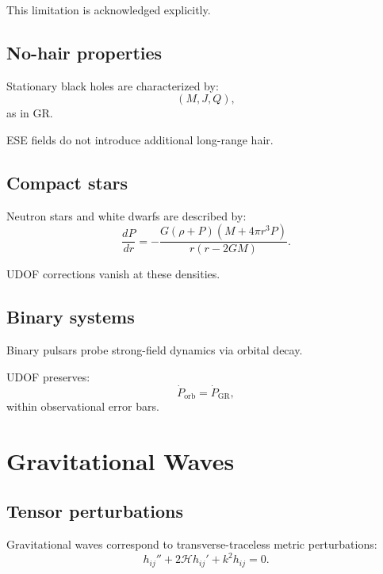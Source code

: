 \documentclass[11pt]{book}
\begin{document}
This limitation is acknowledged explicitly.

\section{No-hair properties}

Stationary black holes are characterized by:
\begin{equation}
(M, J, Q),
\end{equation}
as in GR.

ESE fields do not introduce additional long-range hair.

\section{Compact stars}

Neutron stars and white dwarfs are described by:
\begin{equation}
\frac{dP}{dr} =
- \frac{G (\rho + P)(M + 4\pi r^3 P)}{r(r - 2GM)}.
\end{equation}

UDOF corrections vanish at these densities.

\section{Binary systems}

Binary pulsars probe strong-field dynamics via orbital decay.

UDOF preserves:
\begin{equation}
\dot{P}_{\mathrm{orb}}
=
\dot{P}_{\mathrm{GR}},
\end{equation}
within observational error bars.

\chapter{Gravitational Waves}

\section{Tensor perturbations}

Gravitational waves correspond to transverse-traceless metric perturbations:
\begin{equation}
h_{ij}'' + 2\mathcal{H} h_{ij}' + k^2 h_{ij} = 0.
\end{equation}
\end{document}
